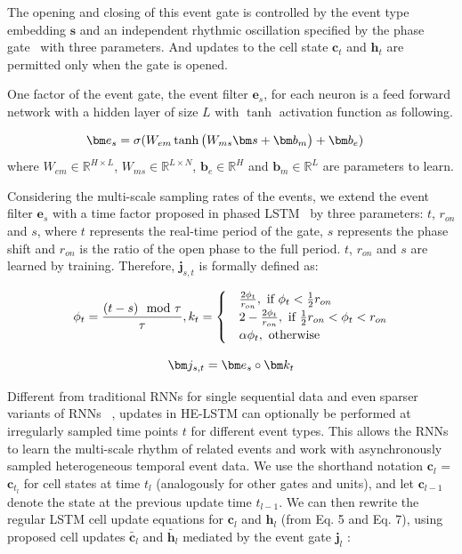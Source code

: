 \documentclass[letterpaper]{article} %
\begin{document}
 The
opening and closing of this event gate is controlled by the event type embedding $\bm s$ and an independent rhythmic oscillation specified by the phase gate~\cite{neil2016phased} with three parameters.
And updates to the cell state $\bm c_t$ and $\bm h_t$ are permitted only when the gate is opened.

One factor of the event gate, the event filter $\bm e_{s}$, for each neuron is a feed forward network with a hidden layer of size $L$ with $\tanh$ activation function as following.

\begin{align}
\setlength{\abovedisplayskip}{3pt}
\bm e_s &=  \sigma(W_{em} \tanh\big (W_{ms} \bm s + \bm b_m \big) + \bm b_e)
\setlength{\belowdisplayskip}{3pt}
\end{align}
where $ W_{em} \in \mathbb{R}^{H\times L }$, $ W_{ms} \in \mathbb{R}^{L\times N}$, $\bm b_e\in \mathbb{R}^{H}$ and $\bm b_m\in \mathbb{R}^{L}$ are parameters to learn.


 Considering the multi-scale sampling rates of the events, we extend  the event filter $\bm e_s$ with a time factor proposed in phased LSTM~\cite{neil2016phased} by three parameters:  $t$, $r_{on}$ and $s$, where $t$ represents
the real-time period of the gate, $s$ represents the phase shift and
$r_{on}$ is the ratio of the open phase to the full period. $t$, $r_{on}$ and $s$ are learned by training. Therefore, $\bm j_{s,t}$ is formally defined as:

\begin{align}
\setlength{\abovedisplayskip}{3pt}
\phi_t = \frac{(t-s)\mod \tau}{\tau},
k_t = \begin{cases}
 & \frac{2\phi_t}{r_{on}},\text{ if } \phi_t < \frac{1}{2}r_{on} \\
 & 2-\frac{2\phi_t}{r_{on}},\text{ if } \frac{1}{2}r_{on} < \phi_t < r_{on}  \\
 & \alpha\phi_t,\text{ otherwise }
\end{cases}
\setlength{\belowdisplayskip}{3pt}
\end{align}



\begin{equation}
\setlength{\abovedisplayskip}{3pt}
 \bm j_{s,t} = \bm e_s \circ \bm k_t
\setlength{\belowdisplayskip}{3pt}
\end{equation}


Different from traditional RNNs for single sequential data and even sparser variants of RNNs ~\cite{koutnik2014clockwork}, updates in HE-LSTM
can optionally be performed at irregularly sampled time points $t$ for different event types.
This allows the RNNs to learn the multi-scale rhythm of related events and work with asynchronously sampled
heterogeneous temporal event data.
We use the shorthand notation $\bm c_l$ = $\bm c_{t_l}$ for cell
states at time $t_l$ (analogously for other gates and units), and let $\bm c_{l-1}$ denote the state at the previous
update time $t_{l-1}$. We can then rewrite the regular LSTM cell update equations for $\bm c_l$ and $\bm h_l$ (from
Eq. 5 and Eq. 7), using proposed cell updates $\tilde{\bm c_l}$ and $\tilde{\bm h_l}$ mediated by the event gate $\bm j_l$ :
\end{document}
